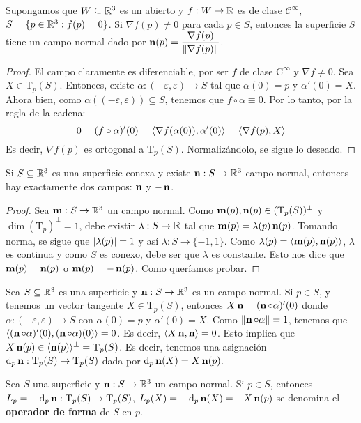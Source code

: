 \begin{prop}
Supongamos que $W\subseteq\mathbb{R}^3$ es un abierto y $f:W\to\mathbb{R}$ es de clase $\mathscr{C}^\infty$, $S=\{p\in\mathbb{R}^3:f(p)=0\}$. Si $\nabla f(p)\neq 0$ para cada $p\in S$, entonces la superficie $S$ tiene un campo normal dado por $\operatorname{\mathbf{n}}(p)=\dfrac{\nabla f(p)}{\left\| \nabla f(p) \right\|}$.
\begin{proof}
El campo claramente es diferenciable, por ser $f$ de clase $\mathrm{C}^\infty$ y $\nabla f\neq 0$. Sea $X\in\mathrm{T}_p(S)$. Entonces, existe $\alpha:(-\varepsilon,\varepsilon)\to S$ tal que $\alpha(0)=p$ y $\alpha'(0)=X$. Ahora bien, como $\alpha((-\varepsilon,\varepsilon))\subseteq S$, tenemos que $f\circ\alpha\equiv 0$. Por lo tanto, por la regla de la cadena: $$0 = (f\circ\alpha)'(0)=\left\langle \nabla f(\alpha(0)),\alpha'(0) \right\rangle = \left\langle \nabla f(p),X \right\rangle$$ Es decir, $\nabla f(p)$ es ortogonal a $\mathrm{T}_p(S)$. Normalizándolo, se sigue lo deseado.
\end{proof}
\end{prop}

\begin{prop}
Si $S\subseteq\mathbb{R}^3$ es una superficie conexa y existe $\operatorname{\mathbf{n}}:S\to\mathbb{R}^3$ campo normal, entonces hay exactamente dos campos: $\operatorname{\mathbf{n}}$ y $-\operatorname{\mathbf{n}}$.
\begin{proof}
Sea $\mathbf{m}:S\to\mathbb{R}^3$ un campo normal. Como $\mathbf{m}(p),\operatorname{\mathbf{n}}(p)\in(\mathrm{T}_p(S))^\perp$ y $\dim (\mathrm{T}_p)^\perp = 1$, debe existir $\lambda:S\to\mathbb{R}$ tal que $\mathbf{m}(p)=\lambda(p)\operatorname{\mathbf{n}}(p)$. Tomando norma, se sigue que $\left\lvert \lambda(p) \right\rvert=1$ y así $\lambda:S\to \{-1,1\}$. Como $\lambda(p)=\left\langle \mathbf{m}(p),\operatorname{\mathbf{n}}(p) \right\rangle$, $\lambda$ es continua y como $S$ es conexo, debe ser que $\lambda$ es constante. Esto nos dice que $\mathbf{m}(p)=\operatorname{\mathbf{n}}(p)$ o $\mathbf{m}(p)=-\operatorname{\mathbf{n}}(p)$. Como queríamos probar.
\end{proof}
\end{prop}

Sea $S\subseteq\mathbb{R}^3$ es una superficie y $\operatorname{\mathbf{n}}:S\to\mathbb{R}^3$ es un campo normal. Si $p\in S$, y tenemos un vector tangente $X\in\mathrm{T}_p(S)$, entonces $X\operatorname{\mathbf{n}} = (\operatorname{\mathbf{n}}\circ\alpha)'(0)$ donde $\alpha:(-\varepsilon,\varepsilon)\to S$ con $\alpha(0)=p$ y $\alpha'(0)=X$. Como $\left\| \operatorname{\mathbf{n}}\circ\alpha \right\|=1$, tenemos que $\left\langle (\operatorname{\mathbf{n}}\circ\alpha)'(0),(\operatorname{\mathbf{n}}\circ\alpha)(0) \right\rangle=0$. Es decir, $\left\langle X\operatorname{\mathbf{n}},\operatorname{\mathbf{n}} \right\rangle=0$. Esto implica que $X\operatorname{\mathbf{n}}(p)\in \langle\operatorname{\mathbf{n}}(p)\rangle^\perp = \mathrm{T}_p(S)$. Es decir, tenemos una asignación $\mathop{}\!\mathrm{d}_p\operatorname{\mathbf{n}}:\mathrm{T}_p(S)\to\mathrm{T}_p(S)$ dada por $\mathop{}\!\mathrm{d}_p\operatorname{\mathbf{n}}(X)=X\operatorname{\mathbf{n}}(p)$.

\begin{defn}
Sea $S$ una superficie y $\operatorname{\mathbf{n}}:S\to\mathbb{R}^3$ un campo normal. Si $p\in S$, entonces $L_p=-\mathop{}\!\mathrm{d}_p\operatorname{\mathbf{n}}:\mathrm{T}_p(S)\to\mathrm{T}_p(S)$, $L_p(X)=-\mathop{}\!\mathrm{d}_p\operatorname{\mathbf{n}}(X) = -X\operatorname{\mathbf{n}}(p)$ se denomina el \textbf{operador de forma} de $S$ en $p$.
\end{defn}

